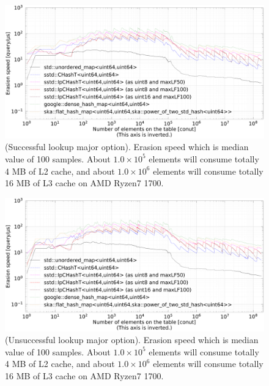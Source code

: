 \begin{figure}[h]
  \hspace{-3mm}
  \includegraphics[scale=0.24]{./fig_bench_sm/erase_med.pdf}
  \caption{
    (Successful lookup major option). Erasion speed which is median value of 100 samples.
    About $1.0\times10^5$ elements will consume totally 4 MB of L2 cache,
    and about $1.0\times10^6$ elements will consume totally 16 MB of L3 cache on AMD Ryzen7 1700.
  }
  \label{fig_bench_erase_sm}
\end{figure}

\begin{figure}[h]
  \hspace{-3mm}
  \includegraphics[scale=0.24]{./fig_bench_usm/erase_med.pdf}
  \caption{
    (Unsuccessful lookup major option). Erasion speed which is median value of 100 samples.
    About $1.0\times10^5$ elements will consume totally 4 MB of L2 cache,
    and about $1.0\times10^6$ elements will consume totally 16 MB of L3 cache on AMD Ryzen7 1700.
  }
  \label{fig_bench_erase_um}
\end{figure}
















